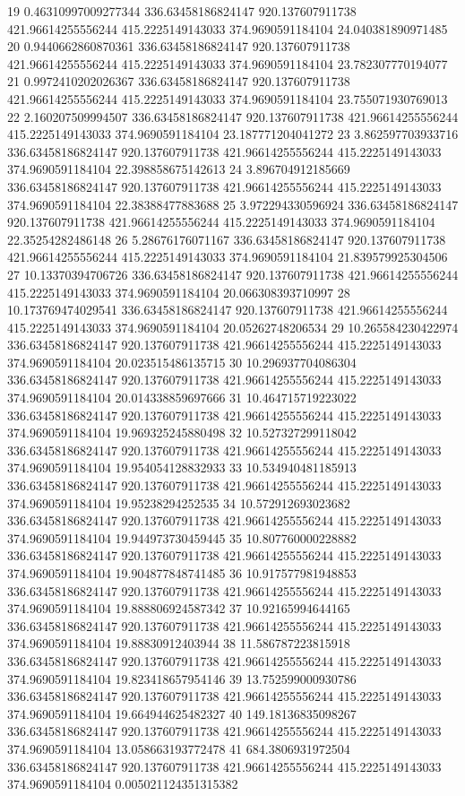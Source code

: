 {19 0.46310997009277344 336.63458186824147 920.137607911738 421.96614255556244 415.2225149143033 374.9690591184104 24.040381890971485
20 0.9440662860870361 336.63458186824147 920.137607911738 421.96614255556244 415.2225149143033 374.9690591184104 23.782307770194077
21 0.9972410202026367 336.63458186824147 920.137607911738 421.96614255556244 415.2225149143033 374.9690591184104 23.755071930769013
22 2.160207509994507 336.63458186824147 920.137607911738 421.96614255556244 415.2225149143033 374.9690591184104 23.187771204041272
23 3.862597703933716 336.63458186824147 920.137607911738 421.96614255556244 415.2225149143033 374.9690591184104 22.398858675142613
24 3.896704912185669 336.63458186824147 920.137607911738 421.96614255556244 415.2225149143033 374.9690591184104 22.38388477883688
25 3.972294330596924 336.63458186824147 920.137607911738 421.96614255556244 415.2225149143033 374.9690591184104 22.35254282486148
26 5.28676176071167 336.63458186824147 920.137607911738 421.96614255556244 415.2225149143033 374.9690591184104 21.839579925304506
27 10.13370394706726 336.63458186824147 920.137607911738 421.96614255556244 415.2225149143033 374.9690591184104 20.066308393710997
28 10.173769474029541 336.63458186824147 920.137607911738 421.96614255556244 415.2225149143033 374.9690591184104 20.05262748206534
29 10.265584230422974 336.63458186824147 920.137607911738 421.96614255556244 415.2225149143033 374.9690591184104 20.023515486135715
30 10.296937704086304 336.63458186824147 920.137607911738 421.96614255556244 415.2225149143033 374.9690591184104 20.014338859697666
31 10.464715719223022 336.63458186824147 920.137607911738 421.96614255556244 415.2225149143033 374.9690591184104 19.969325245880498
32 10.527327299118042 336.63458186824147 920.137607911738 421.96614255556244 415.2225149143033 374.9690591184104 19.954054128832933
33 10.534940481185913 336.63458186824147 920.137607911738 421.96614255556244 415.2225149143033 374.9690591184104 19.95238294252535
34 10.572912693023682 336.63458186824147 920.137607911738 421.96614255556244 415.2225149143033 374.9690591184104 19.944973730459445
35 10.807760000228882 336.63458186824147 920.137607911738 421.96614255556244 415.2225149143033 374.9690591184104 19.904877848741485
36 10.917577981948853 336.63458186824147 920.137607911738 421.96614255556244 415.2225149143033 374.9690591184104 19.888806924587342
37 10.92165994644165 336.63458186824147 920.137607911738 421.96614255556244 415.2225149143033 374.9690591184104 19.88830912403944
38 11.586787223815918 336.63458186824147 920.137607911738 421.96614255556244 415.2225149143033 374.9690591184104 19.823418657954146
39 13.752599000930786 336.63458186824147 920.137607911738 421.96614255556244 415.2225149143033 374.9690591184104 19.664944625482327
40 149.18136835098267 336.63458186824147 920.137607911738 421.96614255556244 415.2225149143033 374.9690591184104 13.058663193772478
41 684.3806931972504 336.63458186824147 920.137607911738 421.96614255556244 415.2225149143033 374.9690591184104 0.005021124351315382
}\tableexpivwaitecomsmphexc
